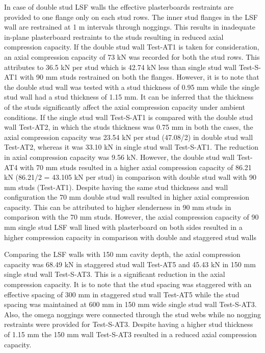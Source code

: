 In case of double stud LSF walls the effective plasterboards restraints are provided to one flange only on each stud rows. The inner stud flanges in the LSF wall are restrained at 1 m intervals through noggings. This results in inadequate in-plane plasterboard restraints to the studs resulting in reduced axial compression capacity. If the double stud wall Test-AT1 is taken for consideration, an axial compression capacity of 73 kN was recorded for both the stud rows. This attributes to 36.5 kN per stud which is 42.74 kN less than single stud wall Test-S-AT1 with 90 mm studs restrained on both the flanges. However, it is to note that the double stud wall was tested with a stud thickness of 0.95 mm while the single stud wall had a stud thickness of 1.15 mm. It can be inferred that the thickness of the studs significantly affect the axial compression capacity under ambient conditions. If the single stud wall Test-S-AT1 is compared with the double stud wall Test-AT2, in which the studs thickness was 0.75 mm in both the cases, the axial compression capacity was 23.54 kN per stud (47.08/2) in double stud wall Test-AT2, whereas it was 33.10 kN in single stud wall Test-S-AT1. The reduction in axial compression capacity was 9.56 kN. However, the double stud wall Test-AT4 with 70 mm studs resulted in a higher axial compression capacity of 86.21 kN (86.21/2 = 43.105 kN per stud) in comparison with double stud wall with 90 mm studs (Test-AT1). Despite having the same stud thickness and wall configuration the 70 mm double stud wall resulted in higher axial compression capacity. This can be attributed to higher slenderness in 90 mm studs in comparison with the 70 mm studs. However, the axial compression capacity of 90 mm single stud LSF wall lined with plasterboard on both sides resulted in a higher compression capacity in comparison with double and staggered stud walls 

Comparing the LSF walls with 150 mm cavity depth, the axial compression capacity was 68.49 kN in staggered stud wall Test-AT5 and 45.43 kN in 150 mm single stud wall Test-S-AT3. This is a significant reduction in the axial compression capacity. It is to note that the stud spacing was staggered with an effective spacing of 300 mm in staggered stud wall Test-AT5 while the stud spacing was maintained at 600 mm in 150 mm wide single stud wall Test-S-AT3. Also, the omega noggings were connected through the stud webs while no nogging restraints were provided for Test-S-AT3. Despite having a higher stud thickness of 1.15 mm the 150 mm wall Test-S-AT3 resulted in a reduced axial compression capacity. 

